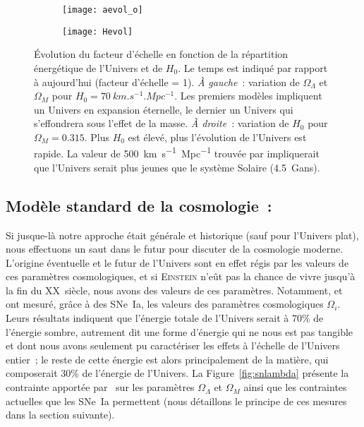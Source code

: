 \documentclass[../main/main.tex]{subfiles}
\begin{document}
\begin{figure}[ht]
    \centering
    \begin{subfigure}[c]{.48\linewidth}
        \centering
        \texttt{[image: aevol\_o]}
        \label{fig:aevol_l}
    \end{subfigure}
    \hfill
    \begin{subfigure}[c]{.48\linewidth}
        \centering
        \texttt{[image: Hevol]}
        \label{fig:aevol_l}
    \end{subfigure}
    \caption[Évolution du facteur d'échelle en fonction de la répartition
    énergétique de l'Univers et de $H_0$]{Évolution du facteur d'échelle en
        fonction de la répartition énergétique de l'Univers et de $H_0$. Le
        temps est indiqué par rapport à aujourd'hui (facteur d'échelle = 1).
        \textit{À gauche}~: variation de $\Omega_\Lambda$ et $\Omega_M$ pour
        $H_0 = \SI{70}{km.s^{-1}.Mpc^{-1}}$. Les premiers modèles impliquent un
        Univers en expansion éternelle, le dernier un Univers qui s'effondrera
        sous l'effet de la masse. \textit{À droite}~: variation de $H_0$ pour
        $\Omega_M = \num{0.315}$. Plus $H_0$ est élevé, plus l'évolution de
        l'Univers est rapide. La valeur de \SI{500}{km.s^{-1}.Mpc^{-1}} trouvée
        par \cite{hubble1929} impliquerait que l'Univers serait plus jeunes que
    le système Solaire (\SI{4.5}{Gans}).}\label{fig:aevol}
\end{figure}

\subsection{Modèle standard de la cosmologie~: \lcdm}\label{sec:MS}

Si jusque-là notre approche était générale et historique (sauf pour l'Univers
plat), nous effectuons un saut dans le futur pour discuter de la cosmologie
moderne. L'origine éventuelle et le futur de l'Univers sont en effet régis par les
valeurs de ces paramètres cosmologiques, et si \textsc{Einstein} n'eût pas la
chance de vivre jusqu'à la fin du XX\ieme~siècle, nous avons des valeurs de ces
paramètres. Notamment, \cite{riess1998} et~\cite{perlmutter1999} ont mesuré,
grâce à des SNe~Ia, les valeurs des paramètres cosmologiques $\Omega_i$. Leurs
résultats indiquent que l'énergie totale de l'Univers serait à 70\% de l'énergie
sombre, autrement dit une forme d'énergie qui ne nous est pas tangible et dont
nous avons seulement pu caractériser les effets à l'échelle de l'Univers entier~; le
reste de cette énergie est alors principalement de la matière, qui composerait
30\% de l'énergie de l'Univers. La Figure~\ref{fig:snlambda} présente la
contrainte apportée par~\cite{riess1998} sur les paramètres $\Omega_\Lambda$ et
$\Omega_M$ ainsi que les contraintes actuelles que les SNe~Ia permettent (nous
détaillons le principe de ces mesures dans la section suivante).
\end{document}
